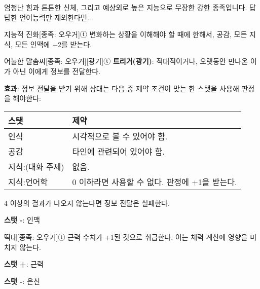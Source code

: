 \documentclass{report}
\begin{document}
	엄청난 힘과 튼튼한 신체, 그리고 예상외로 높은 지능으로 무장한 강한 종족입니다. 답답한 언어능력만 제외한다면...
	
	\begin{story}{지능적 진화}{[종족: 오우거]ⓣ}
		변화하는 상황을 이해해야 할 때에 한해서, 공감, 모든 지식, 모든 인맥에 +2를 받는다.
		
	\end{story}
	
	\begin{story}{어눌한 말솜씨}{[종족: 오우거][광기]ⓣ}
		\textbf{트리거(광기)}: 적대적이거나, 오랫동안 만나온 이가 아닌 이에게 정보를 전달한다.
		
		\textbf{효과}: 정보 전달을 받기 위해 상대는 다음 중 제약 조건이 맞는 한 스탯을 사용해 판정을 해야한다:
		
		\begin{center}
			\begin{tabular}{l|l}
				\textbf{스탯}    & \textbf{제약}                                  \\\hline\hline
				인식             & 시각적으로 볼 수 있어야 함.                    \\\hline
				공감             & 타인에 관련되어 있어야 함.                     \\\hline
				지식:(대화 주제) & 없음.                                          \\\hline
				지식:언어학      & 0 이하라면 사용할 수 없다. 판정에 +1을 받는다.
			\end{tabular}
		\end{center}
		
		4 이상의 결과가 나오지 않는다면 정보 전달은 실패한다.
		
		\textbf{스탯 -}: 인맥
		
	\end{story}
	
	\begin{story}{떡대}{[종족: 오우거]ⓣ}
		근력 수치가 +1된 것으로 취급한다. 이는 체력 계산에 영향을 미치지 않는다.
		
		\textbf{스탯 +}: 근력
		
		\textbf{스탯 -}: 은신
		
	\end{story}
\end{document}

